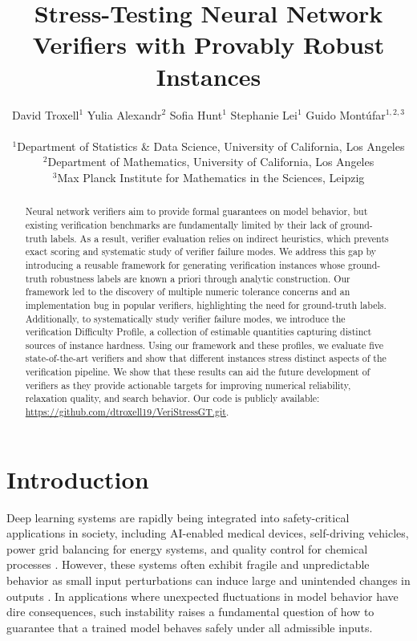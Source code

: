 \documentclass{article}
\title{Stress-Testing Neural Network Verifiers with Provably Robust Instances}
\author{
David Troxell$^{1}$ \And
Yulia Alexandr$^{2}$ \And
Sofia Hunt$^{1}$ \And
Stephanie Lei$^{1}$ \And
Guido Mont\'ufar$^{1,2,3}$ \\
\\
$^1$Department of Statistics \& Data Science, University of California, Los Angeles \\
$^2$Department of Mathematics, University of California, Los Angeles \\
$^3$Max Planck Institute for Mathematics in the Sciences, Leipzig}
\theoremstyle{definition}
\begin{document}
\maketitle

\begin{abstract}
Neural network verifiers aim to provide formal guarantees on model behavior, but existing verification benchmarks are fundamentally limited by their lack of ground-truth labels. As a result, verifier evaluation relies on indirect heuristics, which prevents exact scoring and systematic study of verifier failure modes. We address this gap by introducing a reusable framework for generating verification instances whose ground-truth robustness labels are known a priori through analytic construction. Our framework led to the discovery of multiple numeric tolerance concerns and an implementation bug in popular verifiers, highlighting the need for ground-truth labels. Additionally, to systematically study verifier failure modes, we introduce the verification Difficulty Profile, a collection of estimable quantities capturing distinct sources of instance hardness. Using our framework and these profiles, we evaluate five state-of-the-art verifiers and show that different instances stress distinct aspects of the verification pipeline. We show that these results can aid the future development of verifiers as they provide actionable targets for improving numerical reliability, relaxation quality, and search behavior. Our code is publicly available: \url{https://github.com/dtroxell19/VeriStressGT.git}.
\end{abstract}

\section{Introduction}
Deep learning systems are rapidly being integrated into safety-critical applications in society, including AI-enabled medical devices, self-driving vehicles, power grid balancing for energy systems, and quality control for chemical processes \citep{stanford_ai_index_2025, ozcanli2020deep, yu2023challenges}. 
However, these systems often exhibit fragile and unpredictable behavior as small input perturbations can induce large and unintended changes in outputs \citep{drenkow2022systematicreviewrobustnessdeep, Meng_2024, LIU2023175}. 
In applications where unexpected fluctuations in model behavior have dire consequences, such instability raises a fundamental question of how to guarantee that a trained model behaves safely under all admissible inputs.
\end{document}
